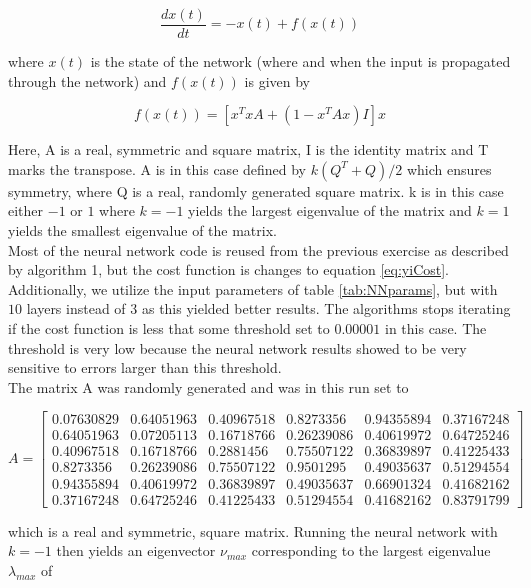 \documentclass[12pt,a4paper]{article}
\begin{document}
\begin{equation}\label{eq:yiCost}
\frac{d x(t)}{dt} = -x(t) + f(x(t))
\end{equation}

\noindent where $x(t)$ is the state of the network (where and when the input is propagated through the network) and $f(x(t))$ is given by 

\begin{equation}\label{eq:fxt}
f(x(t)) = [x^TxA + (1-x^TAx)I]x
\end{equation}

\noindent Here, A is a real, symmetric and square matrix, I is the identity matrix and T marks the transpose. A is in this case defined by $k(Q^T + Q)/2$ which ensures symmetry, where Q is a real, randomly generated square matrix. k is in this case either $-1$ or $1$ where $k = -1$ yields the largest eigenvalue of the matrix and $k = 1$ yields the smallest eigenvalue of the matrix. 
\\
Most of the neural network code is reused from the previous exercise as described by algorithm 1, but the cost function is changes to equation \ref{eq:yiCost}. Additionally, we utilize the input parameters of table \ref{tab:NNparams}, but with $10$ layers instead of $3$ as this yielded better results. The algorithms stops iterating if the cost function is less that some threshold set to $0.00001$ in this case. The threshold is very low because the neural network results showed to be very sensitive to errors larger than this threshold.
\\
The matrix A was randomly generated and was in this run set to

\[
A=
  \begin{bmatrix}
    0.07630829 & 0.64051963 & 0.40967518 & 0.8273356 & 0.94355894 & 0.37167248 \\
    0.64051963 & 0.07205113 & 0.16718766 & 0.26239086 & 0.40619972 & 0.64725246 \\
    0.40967518 & 0.16718766 & 0.2881456 & 0.75507122 & 0.36839897 & 0.41225433 \\
    0.8273356 & 0.26239086 & 0.75507122 & 0.9501295 & 0.49035637 & 0.51294554 \\
    0.94355894 & 0.40619972 & 0.36839897 & 0.49035637 & 0.66901324 & 0.41682162 \\
    0.37167248 & 0.64725246 & 0.41225433 & 0.51294554 & 0.41682162 & 0.83791799 
  \end{bmatrix}
\]

\noindent which is a real and symmetric, square matrix. Running the neural network with $k = -1$ then yields an eigenvector $\nu_{max}$ corresponding to the largest eigenvalue $\lambda_{max}$ of 
\end{document}
